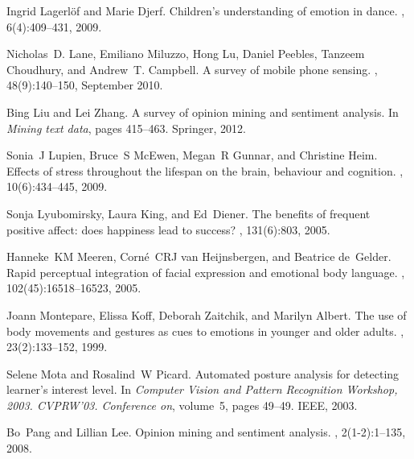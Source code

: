 \documentclass[12pt]{article}
\begin{document}
\begin{small}
\begin{thebibliography}{10}
Ingrid Lagerl{\"o}f and Marie Djerf.
\newblock Children's understanding of emotion in dance.
, 6(4):409--431,
  2009.

Nicholas~D. Lane, Emiliano Miluzzo, Hong Lu, Daniel Peebles, Tanzeem Choudhury,
  and Andrew~T. Campbell.
\newblock A survey of mobile phone sensing.
, 48(9):140--150, September 2010.

Bing Liu and Lei Zhang.
\newblock A survey of opinion mining and sentiment analysis.
\newblock In {\em Mining text data}, pages 415--463. Springer, 2012.

Sonia~J Lupien, Bruce~S McEwen, Megan~R Gunnar, and Christine Heim.
\newblock Effects of stress throughout the lifespan on the brain, behaviour and
  cognition.
, 10(6):434--445, 2009.

Sonja Lyubomirsky, Laura King, and Ed~Diener.
\newblock The benefits of frequent positive affect: does happiness lead to
  success?
, 131(6):803, 2005.

Hanneke~KM Meeren, Corn{\'e}~CRJ van Heijnsbergen, and Beatrice de~Gelder.
\newblock Rapid perceptual integration of facial expression and emotional body
  language.
, 102(45):16518--16523, 2005.

Joann Montepare, Elissa Koff, Deborah Zaitchik, and Marilyn Albert.
\newblock The use of body movements and gestures as cues to emotions in younger
  and older adults.
, 23(2):133--152, 1999.

Selene Mota and Rosalind~W Picard.
\newblock Automated posture analysis for detecting learner's interest level.
\newblock In {\em Computer Vision and Pattern Recognition Workshop, 2003.
  CVPRW'03. Conference on}, volume~5, pages 49--49. IEEE, 2003.

Bo~Pang and Lillian Lee.
\newblock Opinion mining and sentiment analysis.
, 2(1-2):1--135,
  2008.


\end{thebibliography}
\end{small}
\end{document}
